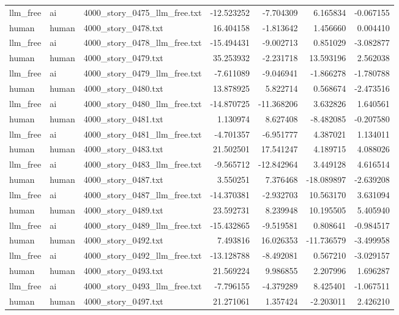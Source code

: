 \begin{longtable}{lllrrrr}
llm\_free & ai & 4000\_story\_0475\_llm\_free.txt & -12.523252 & -7.704309 & 6.165834 & -0.067155 \\
human & human & 4000\_story\_0478.txt & 16.404158 & -1.813642 & 1.456660 & 0.004410 \\
llm\_free & ai & 4000\_story\_0478\_llm\_free.txt & -15.494431 & -9.002713 & 0.851029 & -3.082877 \\
human & human & 4000\_story\_0479.txt & 35.253932 & -2.231718 & 13.593196 & 2.562038 \\
llm\_free & ai & 4000\_story\_0479\_llm\_free.txt & -7.611089 & -9.046941 & -1.866278 & -1.780788 \\
human & human & 4000\_story\_0480.txt & 13.878925 & 5.822714 & 0.568674 & -2.473516 \\
llm\_free & ai & 4000\_story\_0480\_llm\_free.txt & -14.870725 & -11.368206 & 3.632826 & 1.640561 \\
human & human & 4000\_story\_0481.txt & 1.130974 & 8.627408 & -8.482085 & -0.207580 \\
llm\_free & ai & 4000\_story\_0481\_llm\_free.txt & -4.701357 & -6.951777 & 4.387021 & 1.134011 \\
human & human & 4000\_story\_0483.txt & 21.502501 & 17.541247 & 4.189715 & 4.088026 \\
llm\_free & ai & 4000\_story\_0483\_llm\_free.txt & -9.565712 & -12.842964 & 3.449128 & 4.616514 \\
human & human & 4000\_story\_0487.txt & 3.550251 & 7.376468 & -18.089897 & -2.639208 \\
llm\_free & ai & 4000\_story\_0487\_llm\_free.txt & -14.370381 & -2.932703 & 10.563170 & 3.631094 \\
human & human & 4000\_story\_0489.txt & 23.592731 & 8.239948 & 10.195505 & 5.405940 \\
llm\_free & ai & 4000\_story\_0489\_llm\_free.txt & -15.432865 & -9.519581 & 0.808641 & -0.984517 \\
human & human & 4000\_story\_0492.txt & 7.493816 & 16.026353 & -11.736579 & -3.499958 \\
llm\_free & ai & 4000\_story\_0492\_llm\_free.txt & -13.128788 & -8.492081 & 0.567210 & -3.029157 \\
human & human & 4000\_story\_0493.txt & 21.569224 & 9.986855 & 2.207996 & 1.696287 \\
llm\_free & ai & 4000\_story\_0493\_llm\_free.txt & -7.796155 & -4.379289 & 8.425401 & -1.067511 \\
human & human & 4000\_story\_0497.txt & 21.271061 & 1.357424 & -2.203011 & 2.426210 \\

\end{longtable}
